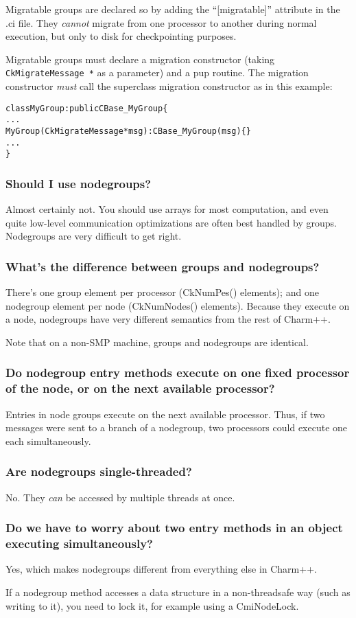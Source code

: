 Migratable groups are declared so by adding the ``[migratable]'' attribute in
the .ci file. They {\em cannot} migrate from one processor to another during
normal execution, but only to disk for checkpointing purposes.

Migratable groups must declare a migration constructor (taking
{\tt CkMigrateMessage *} as a parameter) and a pup routine. The migration
constructor {\em must} call the superclass migration constructor as in this
example:
\begin{alltt}
class MyGroup : public CBase\_MyGroup \{
  ...
  MyGroup (CkMigrateMessage *msg) : CBase\_MyGroup(msg) \{ \}
  ...
\}
\end{alltt}

\subsubsection{Should I use nodegroups?}

Almost certainly not. You should use arrays for most computation, and
even quite low-level communication optimizations are often best handled
by groups. Nodegroups are very difficult to get right.

\subsubsection{What's the difference between groups and nodegroups?}

There's one group element per processor (CkNumPes() elements); and
one nodegroup element per node (CkNumNodes() elements). Because they
execute on a node, nodegroups have very different semantics from the rest
of Charm++.

Note that on a non-SMP machine, groups and nodegroups are identical.


\subsubsection{Do nodegroup entry methods execute on one fixed processor of the node,
or on the next available processor?}

Entries in node groups execute on the next available processor. Thus,
if two messages were sent to a branch of a nodegroup, two processors could
execute one each simultaneously.

\subsubsection{Are nodegroups single-threaded?}

No. They {\em can} be accessed by multiple threads at once.

\subsubsection{Do we have to worry about two entry methods in an object executing simultaneously?}

Yes, which makes nodegroups different from everything else in Charm++.

If a nodegroup method accesses a data structure in a non-threadsafe
way (such as writing to it), you need to lock it, for example using a CmiNodeLock.
